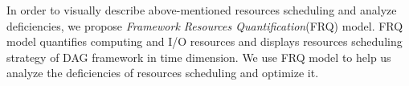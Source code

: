 







{\color{blue}
In order to visually describe above-mentioned resources scheduling and analyze deficiencies, we propose \textit{Framework Resources Quantification}(FRQ) model. FRQ model quantifies computing and I/O resources and displays resources scheduling strategy of DAG framework in time dimension. We use FRQ model to help us analyze the deficiencies of resources scheduling and optimize it.
}

